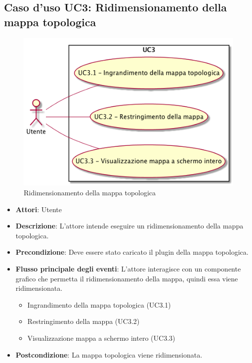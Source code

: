 \subsection{Caso d'uso UC3: Ridimensionamento della mappa topologica}
\begin{figure} [H]
	\centering
	\includegraphics[scale=0.45]{./UC/UC3.png}
	\caption{Ridimensionamento della mappa topologica}\label{}
\end{figure}
\begin{itemize}
	\item \textbf{Attori}: Utente
	\item \textbf{Descrizione}: L'attore intende eseguire un ridimensionamento della mappa topologica.
	\item \textbf{Precondizione}: Deve essere stato caricato il plugin della mappa topologica.
	\item \textbf{Flusso principale degli eventi}: L'attore interagisce con un componente grafico che permetta il ridimensionamento della mappa, quindi essa viene ridimensionata.
	\begin{itemize}
		\item Ingrandimento della mappa topologica (UC3.1)
		\item Restringimento della mappa (UC3.2)
		\item Visualizzazione mappa a schermo intero (UC3.3)
	\end{itemize}
	\item \textbf{Postcondizione}: La mappa topologica viene ridimensionata.
\end{itemize}

 \hypertarget{UC3.1}{}
